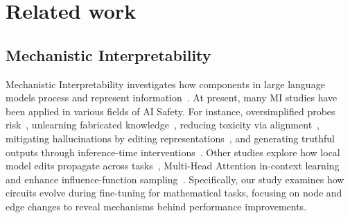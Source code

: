 \section{Related work}
\subsection{Mechanistic Interpretability}
Mechanistic Interpretability investigates how components in large language models process and represent information~\cite{wang2024knowledgemechanismslargelanguage}.
At present, many MI studies have been applied in various fields of AI Safety. For instance, oversimplified probes risk~\cite{friedman2024interpretabilityillusionsgeneralizationsimplified}, unlearning fabricated knowledge~\cite{sun2024learningunlearningfabricatedknowledge}, reducing toxicity via alignment~\cite{lee2024mechanisticunderstandingalignmentalgorithms}, mitigating hallucinations by editing representations~\cite{zhang2024truthxalleviatinghallucinationsediting}, and generating truthful outputs through inference-time interventions~\cite{NEURIPS2023_81b83900}. Other studies explore how local model edits propagate across tasks~\cite{cohen2024evaluating,meng2023masseditingmemorytransformer}, Multi-Head Attention in-context learning~\cite{chen2024transformers,chen2024can} and enhance influence-function sampling~\cite{koh2024faithful}. Specifically, our study examines how circuits evolve during fine-tuning for mathematical tasks, focusing on node and edge changes to reveal mechanisms behind performance improvements.

